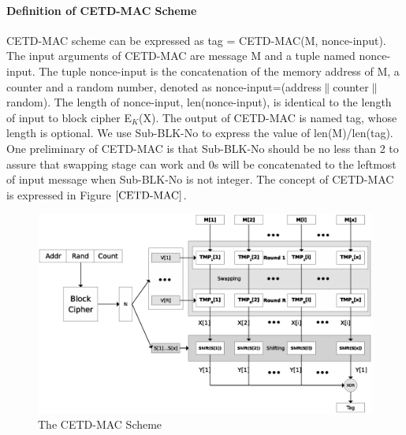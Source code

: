 \documentclass{article}
\begin{document}
\paragraph{Definition of CETD-MAC Scheme}
CETD-MAC scheme can be expressed as tag = CETD-MAC(M, nonce-input). The input arguments of CETD-MAC are message M and a tuple named nonce-input. The tuple nonce-input is the concatenation of the memory address of M, a counter and a random number, denoted as nonce-input=(address$\|$counter$\|$random). The length of nonce-input, len(nonce-input), is identical to the length of input to block cipher E$_K$(X). The output of CETD-MAC is named tag, whose length is optional. We use Sub-BLK-No to express the value of len(M)/len(tag). One preliminary of CETD-MAC is that Sub-BLK-No should be no less than 2 to assure that swapping stage can work and 0s will be concatenated to the leftmost of input message when Sub-BLK-No is not integer.  
The concept of CETD-MAC is expressed in Figure $\ref{CETD-MAC}$.
\begin{figure}[htbp]
 \centering
 \includegraphics[scale=0.6]{./diagrams/CETD.eps}
 \caption{The CETD-MAC Scheme}
 \label{fig:CETD-MAC}
\end{figure}
\end{document}
